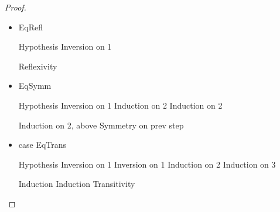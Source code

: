 \begin{proof}
\begin{itemize}
\item EqRefl
  \begin{eqnproof}
              {Hypothesis}
              {Inversion on 1}
  \end{eqnproof}

  \begin{eqnproof}
          {Reflexivity}
  \end{eqnproof}

\item EqSymm
   \begin{eqnproof}
               {Hypothesis}
               {Inversion on 1}
               {Induction on 2}
               {Induction on 2}
   \end{eqnproof}

   \begin{eqnproof}
           {Induction on 2, above}
           {Symmetry on prev step}
   \end{eqnproof}

\item case EqTrans
  \begin{eqnproof}
              {Hypothesis}
              {Inversion on 1}
              {Inversion on 1}
              {Induction on 2}
              {Induction on 3}
  \end{eqnproof}

  \begin{eqnproof}
          {Induction}
          {Induction}
          {Transitivity}
  \end{eqnproof}


\end{itemize}
\end{proof}
